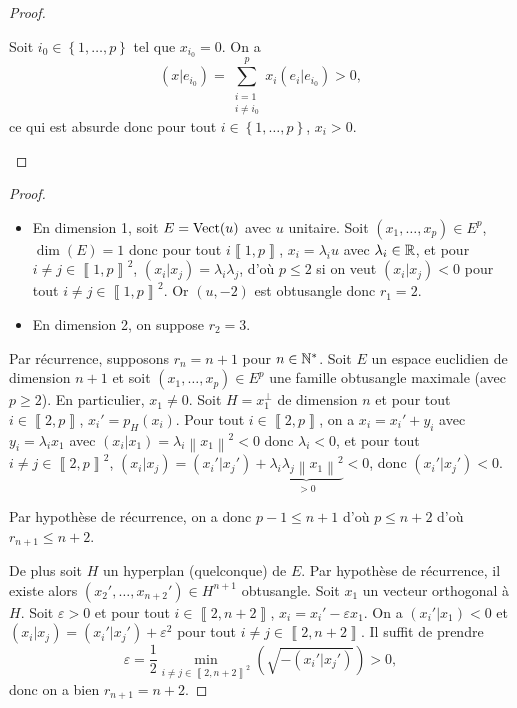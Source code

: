 \documentclass[12pt]{article}
\begin{document}
\begin{proof}
\begin{enumerate}
		Soit $i_0\in\left\lbrace1,\dots,p\right\rbrace$ tel que $x_{i_0}=0$. On a 
		\begin{equation}
			(x|e_{i_0})=\sum_{\substack{i=1\\ i\neq i_0}}^{p}x_i(e_i|e_{i_0})>0,
		\end{equation}
		ce qui est absurde donc pour tout $i\in\left\lbrace1,\dots,p\right\rbrace$, $x_i>0$.
	\end{enumerate}
\end{proof}

\begin{proof}
	\begin{itemize}
		\item En dimension 1, soit $E=\operatorname{Vect}(u)$ avec $u$ unitaire. Soit $(x_1,\dots,x_p)\in E^{p}$, $\dim(E)=1$ donc pour tout $i\left\llbracket1,p\right\rrbracket$, $x_i=\lambda_i u$ avec $\lambda_i\in\mathbb{R}$, et pour $i\neq j\in\left\llbracket1,p\right\rrbracket^{2}$, $(x_i|x_j)=\lambda_i\lambda_j$, d'où $p\leqslant2$ si on veut $(x_i|x_j)<0$ pour tout $i\neq j\in\left\llbracket1,p\right\rrbracket^{2}$. Or $(u,-2)$ est obtusangle donc $r_1=2$.
		\item En dimension 2, on suppose $r_2=3$.
	\end{itemize}

	Par récurrence, supposons $r_n=n+1$ pour $n\in\mathbb{N}^{*}$. Soit $E$ un espace euclidien de dimension $n+1$ et soit $(x_1,\dots,x_p)\in E^{p}$ une famille obtusangle maximale (avec $p\geqslant2$). En particulier, $x_1\neq0$. Soit $H=x_1^{\perp}$ de dimension $n$ et pour tout $i\in\left\llbracket2,p\right\rrbracket$, $x_i'=p_H(x_i)$. Pour tout $i\in\left\llbracket2,p\right\rrbracket$, on a $x_i=x_i'+y_i$ avec $y_i=\lambda_i x_1$ avec $(x_i|x_1)=\lambda_i\left\lVert x_1\right\rVert^{2}<0$ donc $\lambda_i<0$, et pour tout $i\neq j\in\left\llbracket2,p\right\rrbracket^{2}$, $(x_i|x_j)=(x_i'|x_j')+\underbrace{\lambda_i\lambda_j\left\lVert x_1\right\rVert^{2}}_{>0}<0$, donc $(x_{i}'|x_{j}')<0$.

	Par hypothèse de récurrence, on a donc $p-1\leqslant n+1$ d'où $p\leqslant n+2$ d'où $r_{n+1}\leqslant n+2$.

	De plus soit $H$ un hyperplan (quelconque) de $E$. Par hypothèse de récurrence, il existe alors $(x_2',\dots,x_{n+2}')\in H^{n+1}$ obtusangle.
	Soit $x_1$ un vecteur orthogonal à $H$. Soit $\varepsilon>0$ et pour tout $i\in\left\llbracket2,n+2\right\rrbracket$, $x_{i}=x_{i}'-\varepsilon x_1$. On a $(x_i'|x_1)<0$ et $(x_i|x_j)=(x_i'|x_j')+\varepsilon^{2}$ pour tout $i\neq j\in\left\llbracket2,n+2\right\rrbracket$. Il suffit de prendre 
	\begin{equation}
		\varepsilon=\frac{1}{2}\min_{i\neq j\in\left\llbracket2,n+2\right\rrbracket^{2}}\left(\sqrt{-(x_i'|x_j')}\right)>0,
	\end{equation}
	donc on a bien $r_{n+1}=n+2$.
\end{proof}
\end{document}
